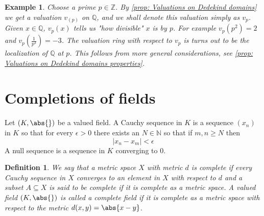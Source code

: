 \documentclass{article}
\newtheorem{definition}{Definition}[section]
\newtheorem{example}{Example}[section]
\newcommand{\mbb}[1]{\mathbb{#1}}
\numberwithin{equation}{section}
\begin{document}
\begin{example}\label{ex: Almost the p-adic numbers}
	Choose a prime $p \in \mbb Z$. By \cref{prop: Valuations on Dedekind domains} we get a valuation $v_{(p)}$ on $\mbb Q$, and we shall denote this valuation simply as $v_p$. Given $x \in \mbb Q$, $v_p(x)$ tells us "how divisible" $x$ is by $p$. For example $v_p(p^2) = 2$ and $v_p(\frac{1}{p^3}) = -3$. The valuation ring with respect to $v_p$ is turns out to be the localization of $\mbb Q$ at $p$. This follows from more general considerations, see \cref{prop: Valuations on Dedekind domains properties}.
\end{example}

\section{Completions of fields}\label{sec: Completions of fields}


Let $(K, \abs{})$ be a valued field. A Cauchy sequence in $K$ is a sequence $(x_n)$ in $K$ so that for every $\epsilon > 0$ there exists an $N \in \mbb N$ so that if $m,n \geq N$ then
$$|x_n - x_m| < \epsilon$$
A null sequence is a sequence in $K$ converging to 0.


\begin{definition}
	We say that a metric space $X$ with metric $d$ is complete if every Cauchy sequence in $X$ converges to an element in $X$ with respect to $d$ and a subset $A \subseteq X$ is said to be complete if it is complete as a metric space. A valued field $(K, \abs{})$ is called a complete field if it is complete as a metric space with respect to the metric $d(x,y) = \abs{x - y}$.
\end{definition}
\end{document}
